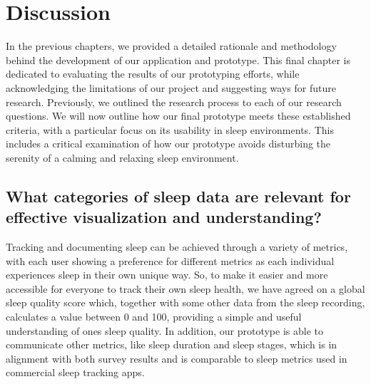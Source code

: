 \documentclass[
  a4paper,  %
  twoside,  %
  bibliography=totoc,
  headsepline,
  cleardoublepage=empty,
  parskip=half,
  draft=false
]{scrbook}
\begin{document}
\chapter{Discussion}

In the previous chapters, we provided a detailed rationale and methodology behind the development of our application and prototype. This final chapter is dedicated to evaluating the results of our prototyping efforts, while acknowledging the limitations of our project and suggesting ways for future research. Previously, we outlined the research process to each of our research questions. We will now outline how our final prototype meets these established criteria, with a particular focus on its usability in sleep environments. This includes a critical examination of how our prototype avoids disturbing the serenity of a calming and relaxing sleep environment.

\section{What categories of sleep data are relevant for effective visualization and understanding?}
Tracking and documenting sleep can be achieved through a variety of metrics, with each user showing a preference for different metrics as each individual experiences sleep in their own unique way. So, to make it easier and more accessible for everyone to track their own sleep health, we have agreed on a global sleep quality score which, together with some other data from the sleep recording, calculates a value between 0 and 100, providing a simple and useful understanding of ones sleep quality. In addition, our prototype is able to communicate other metrics, like sleep duration and sleep stages, which is in alignment with both survey results and is comparable to sleep metrics used in commercial sleep tracking apps.
\end{document}
